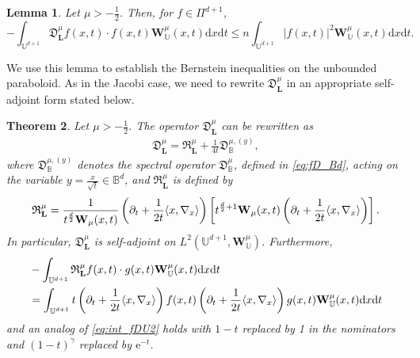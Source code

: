 \documentclass{amsart}
\newtheorem{thm}{Theorem}[section]
\newtheorem{lem}[thm]{Lemma}
\theoremstyle{remark}
\def\la{{\langle}}
\def\ra{{\rangle}}
\def\d{\mathrm{d}}
\def\e{\mathrm{e}}
\def\fD{{\mathfrak D}}
\def\fR{{\mathfrak R}}
\def\g{{\gamma}}
\def\la{{\langle}}
\def\ra{{\rangle}}
\def\Lb{{\mathbf L}}
\def\Wb{{\mathbf W}}
\def\BB{{\mathbb B}}
\def\UU{{\mathbb U}}
\def\f{\frac}
\begin{document}
\begin{lem}\label{lem:mainUU2}
Let $\mu > -\f12$. Then, for $f \in \Pi^{d+1}$, 
$$
  - \int_{\UU^{d+1}} \fD_{\Lb}^{\mu} f(x,t) \cdot f(x,t) \Wb_{\UU}^{\mu} (x,t) \d x \d t 
       \le  n  \int_{\UU^{d+1}} |f(x,t)|^2 \Wb_{\UU}^{\mu} (x,t) \d x \d t.
$$
\end{lem}

We use this lemma to establish the Bernstein inequalities on the unbounded paraboloid. As in the Jacobi 
case, we need to rewrite $\fD_{\Lb}^{\mu}$ in an appropriate self-adjoint form stated below. 

\begin{thm} 
Let $\mu > -\f12$. The operator $ \fD_{\Lb}^{\mu}$ can be rewritten as
\begin{align} \label{eq:fD_UU_B}
 \fD_{\Lb}^{\mu} =  \fR_\Lb^{\mu}  + \frac{1}{4t} \fD_\BB^{\mu, (y)},
\end{align}
where $\fD_\BB^{\mu, (y)}$ denotes the spectral operator $\fD_\BB^\mu$, defined in \eqref{eq:fD_Bd}, acting on 
the variable $y = \frac{x}{\sqrt{t}} \in \BB^d$, and $\fR_\Lb^{\mu} $ is defined by 
\begin{align*}
 \fR_\Lb^{\mu} =  \frac{1}{t^{\f d 2} \Wb_{\mu}(x,t)} \left( \partial_t + \frac{1}{2t} \la x ,\nabla_x\ra \right) 
  \left[t^{\f{d}{2} +1} \Wb_{\mu}(x,t) \left( \partial_t + \frac{1}{2t} \la x ,\nabla_x\ra \right) \right]. \notag
\end{align*}
In particular, $\fD_\Lb^{\mu}$ is self-adjoint on $L^2(\UU^{d+1}, \Wb_{\UU}^{\mu})$. Furthermore, 
\begin{align}\label{eq:int_fDU1B}
  &  - \int_{\UU^{d+1}} \fR_{\Lb}^{\mu} f(x,t)\cdot g(x,t) \Wb_{\UU}^{\mu}(x,t) \d x \d t \\
 &  =   \int_{\UU^{d+1}}  t \left( \partial_t + \frac{1}{2t} \la x ,\nabla_x\ra \right) f(x,t)  
    \left( \partial_t + \frac{1}{2t} \la x ,\nabla_x\ra \right) g(x,t) \Wb_{\UU}^{\mu}(x,t) \d x \d t \notag
\end{align}
and an analog of \eqref{eq:int_fDU2} holds with $1-t$ replaced by 1 in the nominators and $(1-t)^\g$ 
replaced by $\e^{-t}$. 

\end{thm}
\end{document}
